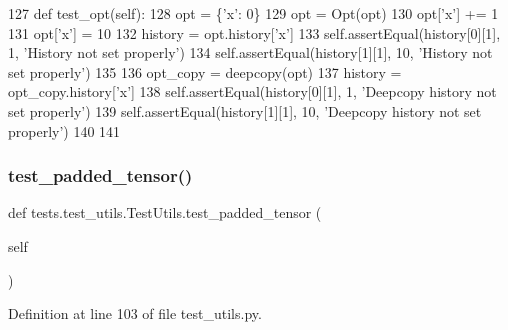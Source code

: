 \begin{DoxyCode}
127     \textcolor{keyword}{def }test\_opt(self):
128         opt = \{\textcolor{stringliteral}{'x'}: 0\}
129         opt = Opt(opt)
130         opt[\textcolor{stringliteral}{'x'}] += 1
131         opt[\textcolor{stringliteral}{'x'}] = 10
132         history = opt.history[\textcolor{stringliteral}{'x'}]
133         self.assertEqual(history[0][1], 1, \textcolor{stringliteral}{'History not set properly'})
134         self.assertEqual(history[1][1], 10, \textcolor{stringliteral}{'History not set properly'})
135 
136         opt\_copy = deepcopy(opt)
137         history = opt\_copy.history[\textcolor{stringliteral}{'x'}]
138         self.assertEqual(history[0][1], 1, \textcolor{stringliteral}{'Deepcopy history not set properly'})
139         self.assertEqual(history[1][1], 10, \textcolor{stringliteral}{'Deepcopy history not set properly'})
140 
141 
\end{DoxyCode}
\mbox{\label{classtests_1_1test__utils_1_1TestUtils_a9d3d0280ce67a3e6b039b9184844dc45}} 
\subsubsection{\texorpdfstring{test\+\_\+padded\+\_\+tensor()}{test\_padded\_tensor()}}
{\footnotesize\ttfamily def tests.\+test\+\_\+utils.\+Test\+Utils.\+test\+\_\+padded\+\_\+tensor (\begin{DoxyParamCaption}\item[{}]{self }\end{DoxyParamCaption})}



Definition at line 103 of file test\+\_\+utils.\+py.


